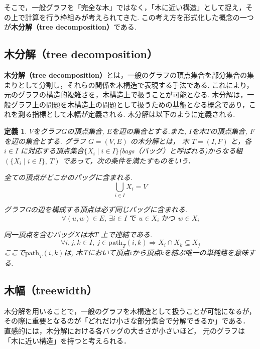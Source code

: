\documentclass[technicalreport]{ieicej}
\newtheorem{definition}{定義}
\begin{document}
そこで，一般グラフを「完全な木」ではなく，「木に近い構造」として捉え，その上で計算を行う枠組みが考えられてきた. 
この考え方を形式化した概念の一つが\textbf{木分解（tree decomposition）}である.

\subsection{木分解（tree decomposition）}
\textbf{木分解（tree decomposition）}とは，一般のグラフの頂点集合を部分集合の集まりとして分割し，それらの関係を木構造で表現する手法である. 
これにより，元のグラフの構造的複雑さを，木構造上で扱うことが可能となる. 
木分解は，一般グラフ上の問題を木構造上の問題として扱うための基盤となる概念であり，これを測る指標として木幅が定義される.
木分解は以下のように定義される\cite{robertson1986graph}.

\begin{definition}
$V$をグラフ$G$の頂点集合, $E$を辺の集合とする.また, $I$を木$T$の頂点集合, $F$を辺の集合とする. 
グラフ $G = (V, E)$ の木分解とは，
木 $T = (I, F)$ と，各 $i \in I$ に対応する頂点集合$\{ X_i \mid i \in I \}$\it(bags（バッグ）と呼ばれる)からなる組$(\{X_i \mid i \in I\},\ T)$
であって，次の条件を満たすものをいう．

\item[(TD1)] 全ての頂点がどこかのバッグに含まれる.
  \[
    \bigcup_{i \in I} X_i = V
  \]

      
  
  \item[(TD2)] グラフGの辺を構成する頂点は必ず同じバッグに含まれる.
 \[
  \forall (u,w) \in E,\ \exists i \in I \text{ で } u \in X_i \text{ かつ } w \in X_i
\]
    

  \item[(TD3)] 同一頂点を含むバッグ$X$は木$T$ 上で連結である.
  \[
  \forall i,j,k \in I,\ 
  j \in \mathrm{path}_T(i,k)
  \Rightarrow
  X_i \cap X_k \subseteq X_j
\]
ここで$\mathrm{path}_T(i,k)$は, 木Tにおいて頂点$i$から頂点$k$を結ぶ唯一の単純路を意味する.    
  \end{definition}


\subsection{木幅（treewidth）}

木分解を用いることで，一般のグラフを木構造として扱うことが可能になるが，
その際に重要となるのが「どれだけ小さな部分集合で分解できるか」である．
直感的には，木分解における各バッグの大きさが小さいほど，
元のグラフは「木に近い構造」を持つと考えられる．
\end{document}
